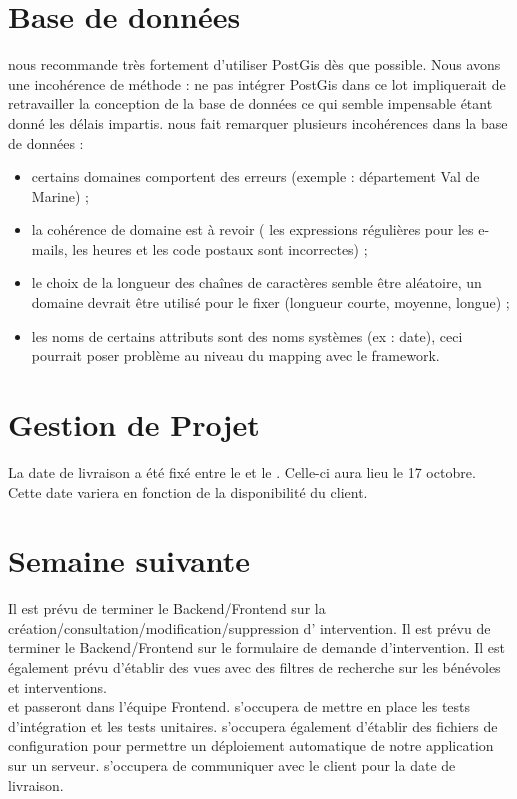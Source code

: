 \documentclass [a4paper] {article}
\begin{document}
\section{Base de données}
\nomTuteurPedago{} nous recommande très fortement d'utiliser PostGis dès que possible. Nous avons une incohérence de méthode : ne pas intégrer PostGis dans ce lot impliquerait de retravailler la conception de la base de données ce qui semble impensable étant donné les délais impartis. 
\nomTuteurPedago{} nous fait remarquer plusieurs incohérences dans la base de données  : 
\begin{itemize}
\item certains domaines comportent des erreurs (exemple : département Val de Marine) ;
\item la cohérence de domaine est à revoir ( les expressions régulières pour les e-mails, les heures et les code postaux sont incorrectes) ;
\item le choix de la longueur des chaînes de caractères semble être aléatoire, un domaine devrait être utilisé pour le fixer (longueur courte, moyenne, longue) ;
\item les noms de certains attributs sont des noms systèmes (ex : date), ceci pourrait poser problème au niveau du mapping avec le framework.
\end{itemize}

\section{Gestion de Projet}
La date de livraison a été fixé entre le \RD{} et le \CP{}. Celle-ci aura lieu le 17 octobre. Cette date variera en fonction de la disponibilité du client.

\section{Semaine suivante}
Il est prévu de terminer le Backend/Frontend sur la création/consultation/modification/suppression d' intervention.
Il est prévu de terminer le Backend/Frontend sur le formulaire de demande d'intervention.
Il est également prévu d'établir des vues avec des filtres de recherche sur les bénévoles et interventions. \\
\Francois{} et \Juliana{} passeront dans l'équipe Frontend. 
\Matthieu{} s'occupera de mettre en place les tests d'intégration et les tests unitaires. 
\Matthieu{} s'occupera également d'établir des fichiers de configuration pour permettre un déploiement automatique de notre application sur un serveur.
\Pierre{} s'occupera de communiquer avec le client pour la date de livraison.


\newpage
\end{document}
